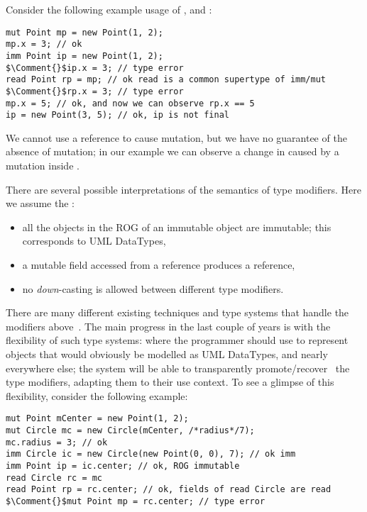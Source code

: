 \noindent Consider the following  example usage of \Q@mut@, \Q@imm@ and \Q@read@:
\begin{lstlisting}
mut Point mp = new Point(1, 2);
mp.x = 3; // ok
imm Point ip = new Point(1, 2);
$\Comment{}$ip.x = 3; // type error
read Point rp = mp; // ok read is a common supertype of imm/mut
$\Comment{}$rp.x = 3; // type error
mp.x = 5; // ok, and now we can observe rp.x == 5
ip = new Point(3, 5); // ok, ip is not final
\end{lstlisting}
\noindent We cannot use a \Q@read@ reference to cause mutation, but we have no guarantee of the absence of mutation; in our example we can observe a change in \Q@rp@ caused by a mutation inside \Q@mp@.


There are several possible interpretations of the semantics of type modifiers.
Here we assume the :
\begin{itemize}
  \item all the objects in the ROG of an immutable object are immutable;
  this corresponds to UML DataTypes,
  \item a mutable field accessed from a \Q@read@ reference produces a \Q@read@ reference,
  \item no \emph{down}-casting is allowed between different type modifiers.
\end{itemize}


\noindent There are many different existing techniques and type systems that handle the modifiers above~\cite{ZibinEtAl10,ClarkeWrigstad03,HallerOdersky10,GordonEtAl12,ServettoZucca15}.
The main progress in the last couple of years is with the flexibility of such type systems: where the programmer should use \Q@imm@ to represent objects that would obviously be modelled as UML DataTypes, and \Q@mut@ nearly everywhere else; the system will be able to transparently promote/recover~\cite{GordonEtAl12,clebsch2015deny,ServettoZucca15} the type modifiers, adapting them to their use context.
To see a glimpse of this flexibility, consider the following example:
\saveSpace
\begin{lstlisting}
mut Point mCenter = new Point(1, 2);
mut Circle mc = new Circle(mCenter, /*radius*/7);
mc.radius = 3; // ok
imm Circle ic = new Circle(new Point(0, 0), 7); // ok imm
imm Point ip = ic.center; // ok, ROG immutable
read Circle rc = mc
read Point rp = rc.center; // ok, fields of read Circle are read
$\Comment{}$mut Point mp = rc.center; // type error
\end{lstlisting}
\saveSpace

